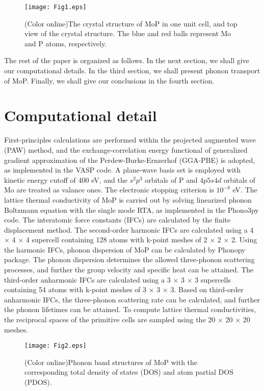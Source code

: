 \documentclass[twocolumn,showkeys,aps,prb,showpacs]{revtex4-1}
\begin{document}
\begin{figure}
  \texttt{[image: Fig1.eps]}
  \caption{(Color online)The crystal structure of MoP in one unit cell, and  top view of the crystal structure. The blue and red balls represent Mo and P atoms, respectively.}\label{st}
\end{figure}



The rest of the paper is organized as follows. In the next
section, we shall give our computational details. In the third section, we shall present phonon transport of MoP. Finally, we shall give our conclusions in the fourth section.




\section{Computational detail}
First-principles calculations are performed within the projected augmented wave (PAW) method, and the exchange-correlation energy functional of generalized gradient approximation of the Perdew-Burke-Ernzerhof (GGA-PBE) is adopted,
as implemented in the VASP code\cite{pv1,pv2,pbe,pv3}.
A plane-wave basis set is employed with
kinetic energy cutoff of 400 eV, and the $s^2p^3$ orbitals of P  and  $4p5s4d$ orbitals of Mo  are treated as valance ones.
The electronic stopping criterion is $10^{-8}$ eV.
The  lattice thermal conductivity of  MoP  is carried out by solving linearized phonon Boltzmann equation with the single mode RTA,   as implemented in the Phono3py code\cite{pv4}. The interatomic force constants (IFCs) are calculated by
the finite displacement method.
 The second-order harmonic IFCs
are calculated using a 4 $\times$ 4 $\times$ 4  supercell  containing
128 atoms with k-point meshes of 2 $\times$ 2 $\times$ 2. Using the harmonic IFCs, phonon dispersion of MoP can be calculated by  Phonopy package\cite{pv5}.  The phonon dispersion determines the allowed three-phonon scattering processes, and further the  group velocity  and specific heat can be attained. The third-order anharmonic IFCs are calculated using a 3 $\times$ 3 $\times$ 3
supercells containing 54 atoms with k-point meshes of 3 $\times$ 3 $\times$ 3.
 Based on third-order anharmonic IFCs, the three-phonon scattering rate can be calculated, and  further   the phonon lifetimes can be attained. To compute lattice thermal conductivities, the
reciprocal spaces of the primitive cells  are sampled using the 20 $\times$ 20 $\times$ 20 meshes.
\begin{figure}
  \texttt{[image: Fig2.eps]}
  \caption{(Color online)Phonon band structures of MoP with the
corresponding total density of states (DOS) and  atom partial DOS (PDOS). }\label{ph}
\end{figure}
\end{document}
